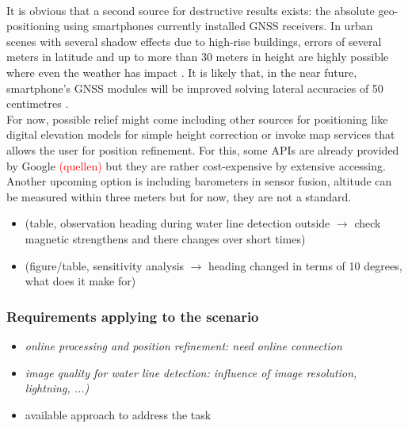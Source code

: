\documentclass[review]{elsarticle}
\begin{document}
\\It is obvious that a second source for destructive results exists: the absolute geo-positioning using smartphones currently installed GNSS receivers. In urban scenes with several shadow effects due to high-rise buildings, errors of several meters in latitude and up to more than 30 meters in height are highly possible where even the weather has impact \cite{Bauer2013, Blum2013, Zandbergen2011}. It is likely that, in the near future, smartphone's GNSS modules will be improved solving lateral accuracies of 50 centimetres \cite{Moore2017}.\\
For now, possible relief might come including other sources for positioning like digital elevation models for simple height correction or invoke map services that allows the user for position refinement. For this, some APIs are already provided by Google \textcolor{red}{(quellen)} but they are rather cost-expensive by extensive accessing. Another upcoming option is including barometers in sensor fusion, altitude can be measured within three meters \cite{Liu2014} but for now, they are not a standard.


\begin{itemize}
\item(table, observation heading during water line detection outside $\rightarrow$ check magnetic strengthens and there changes over short times)
\item (figure/table, sensitivity analysis  $\rightarrow$ heading changed in terms of 10 degrees, what does it make for)
\end{itemize}


\subsubsection{Requirements applying to the scenario}
\label{sec:water_level_gauging_requirements_situation}



\begin{itemize}
\item \textit{online processing and position refinement: need online connection}
\item \textit{image quality for water line detection: influence of image resolution, lightning, ...)}
\end{itemize}





\begin{itemize}
\item available approach to address the task
\end{itemize}
\end{document}
